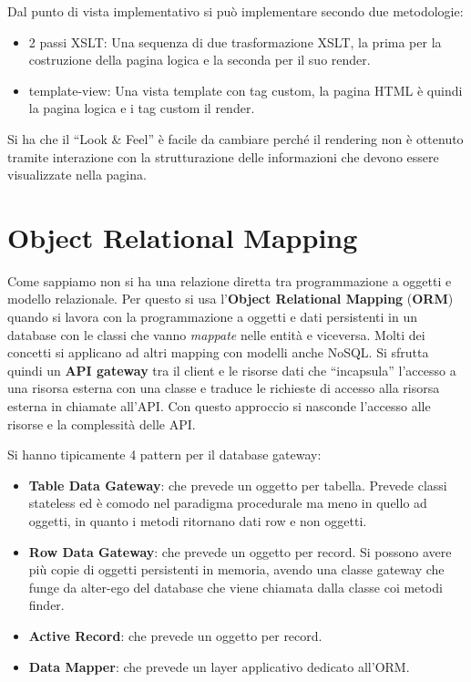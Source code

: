\begin{itemize}
            Dal punto di vista implementativo si può implementare secondo due
            metodologie:
            \begin{itemize}
                  \item 2 passi XSLT: Una sequenza di due trasformazione XSLT,
                        la prima per la costruzione della pagina logica e la
                        seconda per il suo render.
                  \item template-view: Una vista template con tag custom, la
                        pagina HTML è quindi la pagina logica e i tag custom il
                        render.
            \end{itemize}
            Si ha che il “Look \& Feel” è facile da cambiare perché il rendering
            non è ottenuto tramite interazione con la strutturazione delle
            informazioni che devono essere visualizzate nella pagina.
\end{itemize}
\section{Object Relational Mapping}
Come sappiamo non si ha una relazione diretta tra programmazione a oggetti e
modello relazionale. Per questo si usa l'\textbf{Object Relational Mapping}
(\textbf{ORM}) quando si lavora con la programmazione a oggetti e dati persistenti
in un database con le classi che vanno \textit{mappate} nelle entità e viceversa.
Molti dei concetti si applicano ad altri mapping con modelli anche NoSQL. Si
sfrutta quindi un \textbf{API gateway} tra il client e le risorse dati che
“incapsula” l'accesso a una risorsa esterna con una classe e traduce le
richieste di accesso alla risorsa esterna in chiamate all'API. Con questo
approccio si nasconde l'accesso alle risorse e la complessità delle API.

Si hanno tipicamente 4 pattern per il database gateway:
\begin{itemize}
      \item \textbf{Table Data Gateway}: che prevede un oggetto per tabella.
            Prevede classi stateless ed è comodo nel paradigma procedurale ma
            meno in quello ad oggetti, in quanto i metodi ritornano dati row e
            non oggetti.
      \item \textbf{Row Data Gateway}: che prevede un oggetto per record. Si
            possono avere più copie di oggetti persistenti in memoria, avendo
            una classe gateway che funge da alter-ego del database che viene
            chiamata dalla classe coi metodi finder.
      \item \textbf{Active Record}: che prevede un oggetto per record.
      \item \textbf{Data Mapper}: che prevede un layer applicativo dedicato
            all'ORM.
\end{itemize}

